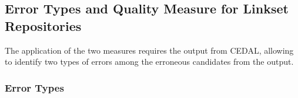 
\subsection{Error Types and Quality Measure for Linkset Repositories} \label{sessionErrorQuality}

The application of the two measures requires the output from CEDAL, allowing to identify two types of errors among the erroneous candidates from the output.


\subsubsection{Error Types} \label{errorType}



